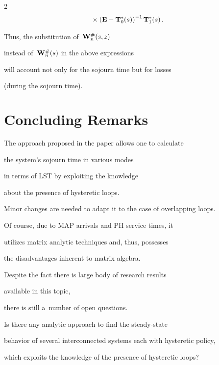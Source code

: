 \begin{multicols}{2}
\begin{multline*}
{}\times


\left( \bmx{E}-\bmx{T}^*_0(s)\right)^{-1}\bmx{T}^*_{1}(s)\,.


\end{multline*}





\noindent Thus, the substitution of~$\mathbf{W}^{\#}_n(s,z)$ 


instead of~$\mathbf{W}^{\#}_n(s)$ in the above expressions


will account not only for the sojourn time but for losses


(during the sojourn time). 











\section{Concluding Remarks}





\noindent


The approach proposed in the paper allows one to calculate


the system's sojourn time in various modes 


in terms of LST by exploiting the knowledge


about the presence of hysteretic loops. 


Minor changes are needed to adapt it to the case of overlapping loops. 


Of course, due to MAP arrivals and PH service times, it


utilizes matrix analytic techniques and, thus, possesses


the disadvantages inherent to matrix algebra.


Despite the fact there is large body of research results 


available in this topic, 


there is still a~number of open questions.


Is there any analytic approach to find the steady-state


behavior of several interconnected systems each with hysteretic policy, 


which exploits the knowledge of the presence of hysteretic loops?



\end{multicols}
